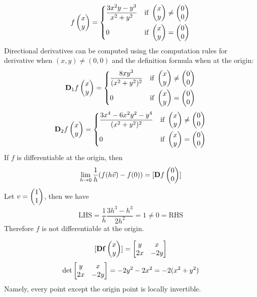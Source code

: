 \documentclass{homework}
\begin{document}
\begin{problem}{2}
$$f\begin{pmatrix}x\\y\end{pmatrix} =
\begin{dcases}
\frac{3x^2y-y^3}{x^2+y^2} & \text{if } \begin{pmatrix}x\\y\end{pmatrix} \neq \begin{pmatrix}0\\0\end{pmatrix} \\
0                         & \text{if } \begin{pmatrix}x\\y\end{pmatrix} = \begin{pmatrix}0\\0\end{pmatrix}
\end{dcases}$$
Directional derivatives can be computed using the computation rules for derivative when $(x, y) \ne (0, 0)$ and the definition formula when at the origin:
$$\mathbf{D}_1f\begin{pmatrix}x\\y\end{pmatrix} =
\begin{dcases}
\frac{8xy^3}{(x^2+y^2)^2} & \text{if } \begin{pmatrix}x\\y\end{pmatrix} \neq \begin{pmatrix}0\\0\end{pmatrix} \\
0                         & \text{if } \begin{pmatrix}x\\y\end{pmatrix} = \begin{pmatrix}0\\0\end{pmatrix}
\end{dcases}$$
$$\mathbf{D}_2f\begin{pmatrix}x\\y\end{pmatrix} =
\begin{dcases}
\frac{3x^4-6x^2y^2-y^4}
{(x^2+y^2)^2} & \text{if } \begin{pmatrix}x\\y\end{pmatrix} \neq \begin{pmatrix}0\\0\end{pmatrix} \\
0             & \text{if } \begin{pmatrix}x\\y\end{pmatrix} = \begin{pmatrix}0\\0\end{pmatrix}
\end{dcases}$$
If $f$ is differentiable at the origin, then
$$\lim_{h \to 0} \frac{1}{h}(f(h\vec{v}) - f(0)) = [\mathbf{D}f\begin{pmatrix}0\\0\end{pmatrix}]$$
Let $v = \begin{pmatrix}1\\1\end{pmatrix}$, then we have
$$\mathrm{LHS} = \frac{1}{h}\frac{3h^3-h^3}{2h^2} = 1 \neq 0 = \mathrm{RHS}$$
Therefore $f$ is not differentiable at the origin.
\end{problem}

\begin{problem}{3}
$$[\mathbf{Df}\begin{pmatrix}x\\y\end{pmatrix}] = \begin{bmatrix}y & x\\2x & -2y\end{bmatrix}$$
$$\det\begin{bmatrix}y & x\\2x & -2y\end{bmatrix} = -2y^2 - 2x^2 = -2(x^2+y^2)$$
Namely, every point except the origin point is locally invertible.
\end{problem}
\end{document}
